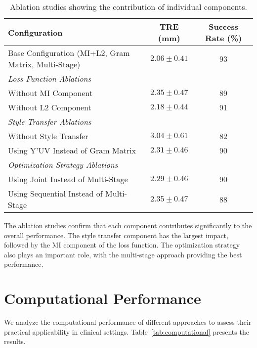 \begin{table}[htpb]
  \caption[Ablation studies]{Ablation studies showing the contribution of individual components.}\label{tab:ablation}
  \centering
  \begin{tabular}{l c c}
    \toprule
      Configuration & TRE (mm) & Success Rate (\%) \\
    \midrule
      Base Configuration (MI+L2, Gram Matrix, Multi-Stage) & $2.06 \pm 0.41$ & 93 \\
    \midrule
      \multicolumn{3}{l}{\textit{Loss Function Ablations}} \\
      Without MI Component & $2.35 \pm 0.47$ & 89 \\
      Without L2 Component & $2.18 \pm 0.44$ & 91 \\
    \midrule
      \multicolumn{3}{l}{\textit{Style Transfer Ablations}} \\
      Without Style Transfer & $3.04 \pm 0.61$ & 82 \\
      Using Y'UV Instead of Gram Matrix & $2.31 \pm 0.46$ & 90 \\
    \midrule
      \multicolumn{3}{l}{\textit{Optimization Strategy Ablations}} \\
      Using Joint Instead of Multi-Stage & $2.29 \pm 0.46$ & 90 \\
      Using Sequential Instead of Multi-Stage & $2.35 \pm 0.47$ & 88 \\
    \bottomrule
  \end{tabular}
\end{table}

The ablation studies confirm that each component contributes significantly to the overall performance. The style transfer component has the largest impact, followed by the MI component of the loss function. The optimization strategy also plays an important role, with the multi-stage approach providing the best performance.

\section{Computational Performance}

We analyze the computational performance of different approaches to assess their practical applicability in clinical settings. Table~\ref{tab:computational} presents the results.

